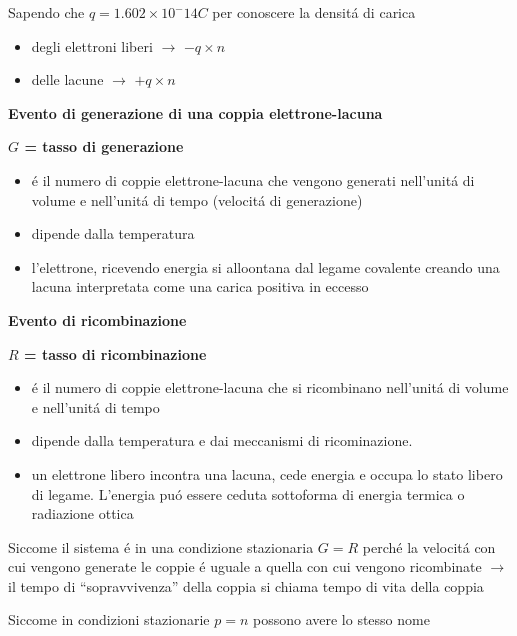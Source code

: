 Sapendo che $q=1.602\times10^-14 C$ per conoscere la densit\'a di carica
\begin{itemize}
    \item degli elettroni liberi $\rightarrow$ $-q\times n$
    \item delle lacune $\rightarrow$ $+q \times n$
\end{itemize}

\begin{multicols}{2}
    \textbf{Evento di generazione di una coppia elettrone-lacuna}

    \textbf{$G$ = tasso di generazione}

    \begin{itemize}
        \item \'e il numero di coppie elettrone-lacuna che vengono generati nell'unit\'a di volume e nell'unit\'a di tempo (velocit\'a di generazione)
        \item dipende dalla temperatura

        \item l'elettrone, ricevendo energia si alloontana dal legame covalente creando una lacuna interpretata come una carica positiva in eccesso
    \end{itemize}


    \columnbreak{}
    \textbf{Evento di ricombinazione}

    \textbf{$R$ = tasso di ricombinazione}
    \begin{itemize}
        \item \'e il numero di coppie elettrone-lacuna che si ricombinano nell'unit\'a di volume e nell'unit\'a di tempo
        \item dipende dalla temperatura e dai meccanismi di ricominazione.
        \item un elettrone libero incontra una lacuna, cede energia e occupa lo stato libero di legame.
            L'energia pu\'o essere ceduta sottoforma di energia termica o radiazione ottica
    \end{itemize}

\end{multicols}

Siccome il sistema \'e in una condizione stazionaria $G=R$ perch\'e la velocit\'a con cui vengono generate le coppie \'e uguale a quella con cui vengono ricombinate $\rightarrow$ il tempo di ``sopravvivenza'' della coppia si chiama tempo di vita della coppia

Siccome in condizioni stazionarie $p=n$ possono avere lo stesso nome


